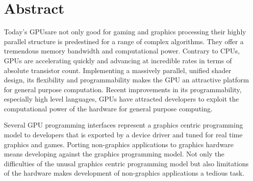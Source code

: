 \begingroup
\let\clearpage\relax
\let\cleardoublepage\relax
\let\cleardoublepage\relax
{}
\section*{Abstract}
Today's \glspl{GPU}are not only good for gaming and graphics processing their
highly parallel structure is predestined for a range of complex algorithms. They
offer a tremendous memory bandwidth and computational power. Contrary to
CPUs, \glspl{GPU} are accelerating quickly and advancing at incredible rates in
terms of absolute transistor count. Implementing a massively parallel, unified
shader design, its flexibility and programmability makes the \gls{GPU} an
attractive platform for general purpose computation. Recent improvements in its
programmability, especially high level languages, \glspl{GPU} have attracted
developers to exploit the computational power of the hardware for general
purpose computing.

Several \gls{GPU} programming interfaces represent a graphics centric
programming model to developers that is exported by a device driver and tuned
for real time graphics and games. Porting non-graphics applications to graphics
hardware means developing against the graphics programming model. Not only the
difficulties of the unusal graphics centric programming model but also
limitations of the hardware makes development of non-graphics applications a
tedious task.

